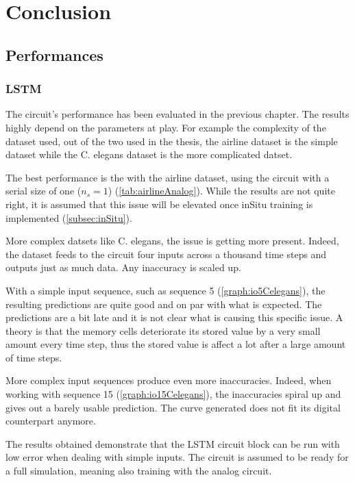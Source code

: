 \section{Conclusion}\label{sec:conc}

\subsection{Performances}

\subsubsection{\ac{LSTM}}

The circuit's performance has been evaluated in the previous chapter. The results highly depend on the parameters at play. For example the complexity of the dataset used, out of the two used in the thesis, the airline dataset is the simple dataset while the \ac{C. elegans} dataset is the more complicated datset.

The best performance is the with the airline dataset, using the circuit with a serial size of one ($n_s=1$) (\cref{tab:airlineAnalog}). While the results are not quite right, it is assumed that this issue will be elevated once inSitu training is implemented (\cref{subsec:inSitu}).

More complex datsets like \ac{C. elegans}, the issue is getting more present. Indeed, the dataset feeds to the circuit four inputs across a thousand time steps and outputs just as much data. Any inaccuracy is scaled up.

With a simple input sequence, such as sequence 5 (\cref{graph:io5Celegans}), the resulting predictions are quite good and on par with what is expected. The predictions are a bit late and it is not clear what is causing this specific issue. A theory is that the memory cells deteriorate its stored value by a very small amount every time step, thus the stored value is affect a lot after a large amount of time steps.

More complex input sequences produce even more inaccuracies. Indeed, when working with sequence 15 (\cref{graph:io15Celegans}), the inaccuracies spiral up and gives out a barely usable prediction. The curve generated does not fit its digital counterpart anymore.

The results obtained demonstrate that the \ac{LSTM} circuit block can be run with low error when dealing with simple inputs. The circuit is assumed to be ready for a full simulation, meaning also training with the analog circuit.

